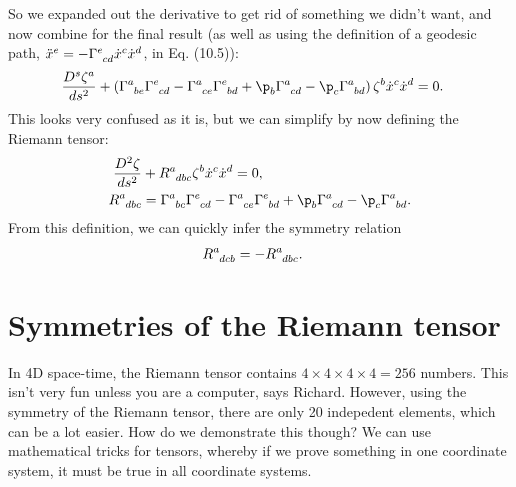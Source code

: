 \documentclass[a4paper, 11pt, normalem]{report}
\begin{document}
So we expanded out the derivative to get rid of something we didn't want, and now combine for the final result (as well as using the definition of a geodesic path, $\ddot{x}^e=-\tensor{\Gamma}{^e_{cd}}\dot{x}^c\dot{x}^d$, in Eq. (10.5)):
\begin{align}
    \frac{D^s\zeta^a}{ds^2} &+ \left(\tensor{\Gamma}{^a_{be}}\tensor{\Gamma}{^e_{cd}}-\tensor{\Gamma}{^a_{ce}}\tensor{\Gamma}{^e_{bd}}+\p_b\tensor{\Gamma}{^a_{cd}}-\p_c\tensor{\Gamma}{^a_{bd}}\right)\zeta^b\dot{x}^c\dot{x}^d = 0.
\end{align}
This looks very confused as it is, but we can simplify by now defining the Riemann tensor:
\begin{align}
    \frac{D^2\zeta}{ds^2} &+ \tensor{R}{^a_{dbc}}\zeta^b\dot{x}^c\dot{x}^d = 0,\\
    \tensor{R}{^a_{dbc}} &= \tensor{\Gamma}{^a_{bc}}\tensor{\Gamma}{^e_{cd}} - \tensor{\Gamma}{^a_{ce}}\tensor{\Gamma}{^e_{bd}} + \p_b\tensor{\Gamma}{^a_{cd}}-\p_c\tensor{\Gamma}{^a_{bd}}.
\end{align}
From this definition, we can quickly infer the symmetry relation
\begin{align}
    \tensor{R}{^a_{dcb}} &= -\tensor{R}{^a_{dbc}}.
\end{align}

\section{Symmetries of the Riemann tensor}
In 4D space-time, the Riemann tensor contains $4\times4\times4\times4 = 256$ numbers. 
This isn't very fun unless you are a computer, says Richard.
However, using the symmetry of the Riemann tensor, there are only 20 indepedent elements, which can be a lot easier. 
How do we demonstrate this though?
We can use mathematical tricks for tensors, whereby if we prove something in one coordinate system, it must be true in all coordinate systems.
\end{document}
